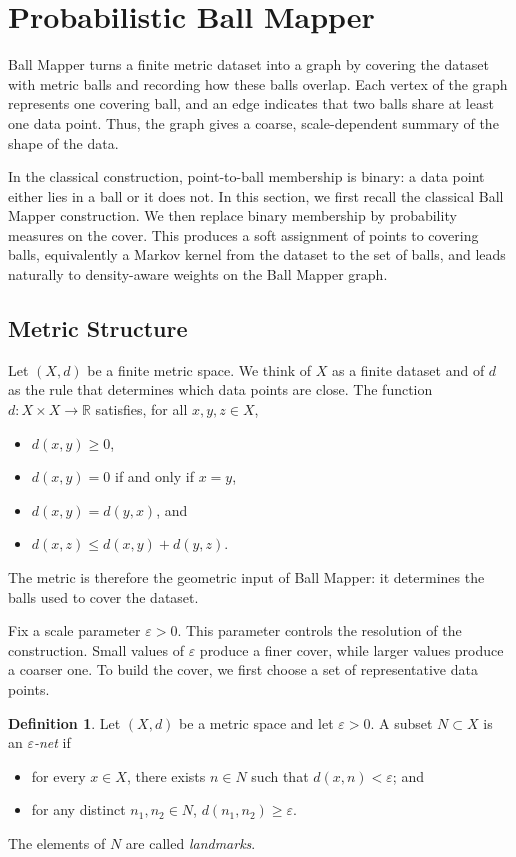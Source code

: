 \documentclass[9pt,a4paper,twocolumn,twoside]{extarticle}
\theoremstyle{definition}
\newtheorem{definition}[theorem]{Definition}
\begin{document}
\section{Probabilistic Ball Mapper}

Ball Mapper turns a finite metric dataset into a graph by covering the dataset with metric balls and recording how these balls overlap. Each vertex of the graph represents one covering ball, and an edge indicates that two balls share at least one data point. Thus, the graph gives a coarse, scale-dependent summary of the shape of the data.

In the classical construction, point-to-ball membership is binary: a data point either lies in a ball or it does not. In this section, we first recall the classical Ball Mapper construction. We then replace binary membership by probability measures on the cover. This produces a soft assignment of points to covering balls, equivalently a Markov kernel from the dataset to the set of balls, and leads naturally to density-aware weights on the Ball Mapper graph.

\subsection{Metric Structure}

Let $(X,d)$ be a finite metric space. We think of $X$ as a finite dataset and of $d$ as the rule that determines which data points are close. The function $d : X \times X \to \mathbb{R}$ satisfies, for all $x,y,z \in X$,
\begin{itemize}
\item $d(x,y) \ge 0$,
\item $d(x,y) = 0$ if and only if $x = y$,
\item $d(x,y) = d(y,x)$, and
\item $d(x,z) \le d(x,y) + d(y,z)$.
\end{itemize}
The metric is therefore the geometric input of Ball Mapper: it determines the balls used to cover the dataset.

Fix a scale parameter $\varepsilon>0$. This parameter controls the resolution of the construction. Small values of $\varepsilon$ produce a finer cover, while larger values produce a coarser one. To build the cover, we first choose a set of representative data points.

\begin{definition}
Let $(X,d)$ be a metric space and let $\varepsilon > 0$. A subset $N \subset X$ is an \emph{$\varepsilon$-net} if
\begin{itemize}
  \item for every $x \in X$, there exists $n \in N$ such that $d(x,n) < \varepsilon$; and
  \item for any distinct $n_1,n_2 \in N$, $d(n_1,n_2) \ge \varepsilon$.
\end{itemize}
The elements of $N$ are called \emph{landmarks}.
\end{definition}
\end{document}
